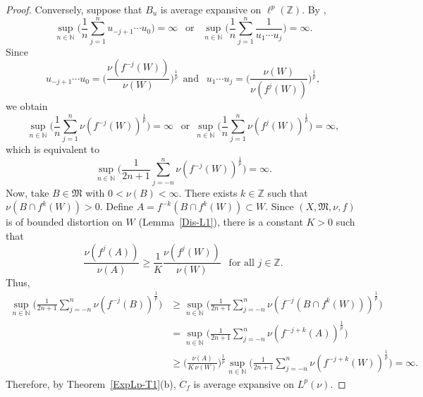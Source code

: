 \documentclass[12pt]{article}
\theoremstyle{plain}
\theoremstyle{definition}
\newcommand{\N}{\mathbb{N}} %
\newcommand{\Z}{\mathbb{Z}} %
\newcommand{\fM}{\mathfrak{M}}
\begin{document}
\begin{proof}
Conversely, suppose that $B_u$ is average expansive on $\ell^p(\Z)$.
By \cite[Proposition~15]{AlvBerMes21},
\[
\sup_{n \in \N} \Big(\frac{1}{n} \sum_{j=1}^n u_{-j+1} \cdots u_0\Big) = \infty \ \ \text{ or } \ \ 
\sup_{n \in \N} \Big(\frac{1}{n} \sum_{j=1}^n \frac{1}{u_1 \cdots u_j}\Big) = \infty.
\]
Since
\[
u_{-j+1} \cdots u_0 = \Big(\frac{\nu(f^{-j}(W))}{\nu(W)}\Big)^\frac{1}{p} \ \ \text {and } \ \ 
u_1 \cdots u_j = \Big(\frac{\nu(W)}{\nu(f^j(W))}\Big)^\frac{1}{p},
\]
we obtain
\[
\sup_{n \in \N} \Big(\frac{1}{n} \sum_{j=1}^n \nu(f^{-j}(W))^\frac{1}{p}\Big) = \infty \ \ \text{ or} \ \ 
\sup_{n \in \N} \Big(\frac{1}{n} \sum_{j=1}^n \nu(f^j(W))^\frac{1}{p}\Big) = \infty,
\]
which is equivalent to
\[
\sup_{n \in \N} \Big(\frac{1}{2n+1} \sum_{j=-n}^n \nu(f^{-j}(W))^\frac{1}{p}\Big) = \infty.
\]
Now, take $B \in \fM$ with $0 < \nu(B) < \infty$. 
There exists $k \in \Z$ such that $\nu(B \cap f^k(W)) > 0$.
Define $A = f^{-k}(B \cap f^k(W)) \subset W$. 
Since $(X,\fM,\nu,f)$ is of bounded distortion on $W$ (Lemma~\ref{Dis-L1}), there is a constant $K > 0$ such that
\[
\frac{\nu(f^j(A))}{\nu(A)} \geq \frac{1}{K} \frac{\nu(f^j(W))}{\nu(W)} \ \ \text{ for all } j \in \Z.
\]
Thus, 
\begin{align*}
\sup_{n \in \N} \Big(\frac{1}{2n+1} \sum_{j=-n}^n \nu(f^{-j}(B))^\frac{1}{p}\Big) 
  &\geq \sup_{n \in \N} \Big(\frac{1}{2n+1} \sum_{j=-n}^n \nu(f^{-j}(B\cap f^k(W)))^\frac{1}{p}\Big)\\
  &= \sup_{n \in \N} \Big(\frac{1}{2n+1} \sum_{j=-n}^n \nu(f^{-j+k}(A))^\frac{1}{p}\Big)\\
  &\geq \Big(\frac{\nu(A)}{K\,\nu(W)}\Big)^\frac{1}{p} \sup_{n \in \N} \Big(\frac{1}{2n+1} \sum_{j=-n}^n \nu(f^{-j+k}(W))^\frac{1}{p}\Big)
  = \infty.
\end{align*}
Therefore, by Theorem~\ref{ExpLp-T1}(b), $C_f$ is average expansive on $L^p(\nu)$.
\end{proof}
\end{document}
